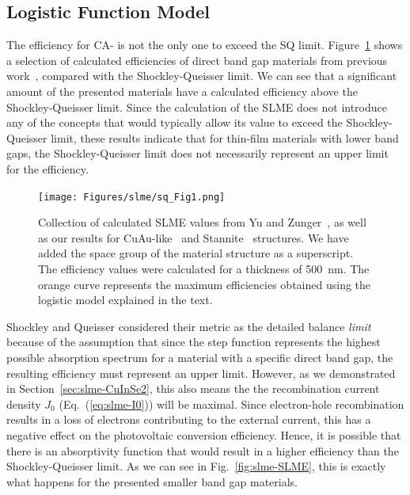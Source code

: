 \begin{refsection}
\subsection{Logistic Function Model} \label{sec:slme-logistic} 
 
The efficiency for CA- is not the only one to exceed the SQ limit. 
Figure~\ref{fig:slme-logistic} shows a selection of calculated efficiencies of 
direct band gap materials from previous work~\cite{Yu2012, Bercx2016, 
Sarmadian2016}, compared with the Shockley-Queisser limit.  We can see that a 
significant amount of the presented materials have a calculated efficiency 
above the Shockley-Queisser limit. Since the calculation of the SLME does not 
introduce any of the concepts that would typically allow its value to exceed 
the Shockley-Queisser limit, these results indicate that for thin-film 
materials with lower band gaps, the Shockley-Queisser limit does not 
necessarily represent an upper limit for the efficiency. 
 
\begin{figure}[h] 
\centering 
\texttt{[image: Figures/slme/sq\_Fig1.png]} 
\caption{Collection of calculated SLME values from Yu and 
Zunger~\cite{Yu2012}, as well as our results for CuAu-like~\cite{Bercx2016} 
and Stannite~\cite{Sarmadian2016} structures. We have added the space group of 
the material structure as a superscript. The efficiency values were calculated 
for a thickness of 500~\si{\nano\meter}. The orange curve represents the 
maximum efficiencies obtained using the logistic model explained in the text.} 
\label{fig:slme-logistic} 
\end{figure} 
 
Shockley and Queisser considered their metric as the detailed balance 
\textit{limit} because of the assumption that since the step function 
represents the highest possible absorption spectrum for a material with a 
specific direct band gap, the resulting efficiency must represent an upper 
limit. However, as we demonstrated in Section~\ref{sec:slme-CuInSe2}, this 
also means the the recombination current density $J_0$ 
(Eq.~(\ref{eq:slme-I0})) will be maximal. Since electron-hole recombination 
results in a loss of electrons contributing to the external current, this has 
a negative effect on the photovoltaic conversion efficiency. Hence, it is 
possible that there is an absorptivity function that would result in a higher 
efficiency than the Shockley-Queisser limit. As we can see in 
Fig.~\ref{fig:slme-SLME}, this is exactly what happens for the presented 
smaller band gap materials. 
 

\end{refsection}
